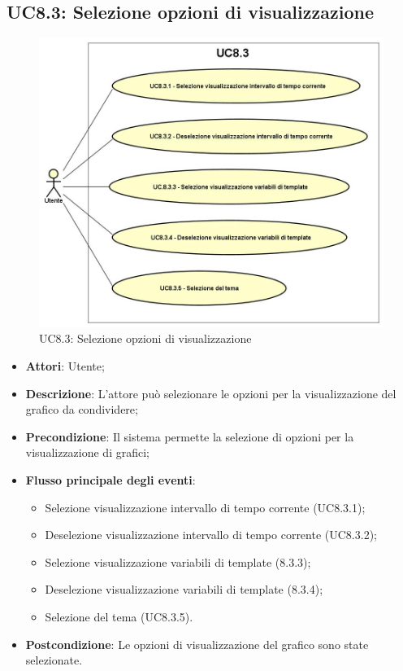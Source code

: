 \subsection{UC8.3: Selezione opzioni di visualizzazione}
\hypertarget{UC8.3}{}
\begin{figure} [H]
	\centering
	\includegraphics[scale=0.45]{Img/UC8-3}
	\caption{UC8.3: Selezione opzioni di visualizzazione}\label{}
\end{figure}
\begin{itemize}
	\item \textbf{Attori}: Utente;
	\item \textbf{Descrizione}: L'attore può selezionare le opzioni per la visualizzazione del grafico da condividere;
	\item \textbf{Precondizione}: Il sistema permette la selezione di opzioni per la visualizzazione di grafici;
	\item \textbf{Flusso principale degli eventi}:
	\begin{itemize}
		\item Selezione visualizzazione intervallo di tempo corrente (UC8.3.1);
		\item Deselezione visualizzazione intervallo di tempo corrente (UC8.3.2);
		\item Selezione visualizzazione variabili di template (8.3.3);
		\item Deselezione visualizzazione variabili di template (8.3.4);
		\item Selezione del tema (UC8.3.5).
	\end{itemize}
	\item \textbf{Postcondizione}: Le opzioni di visualizzazione del grafico sono state selezionate.
\end{itemize}

